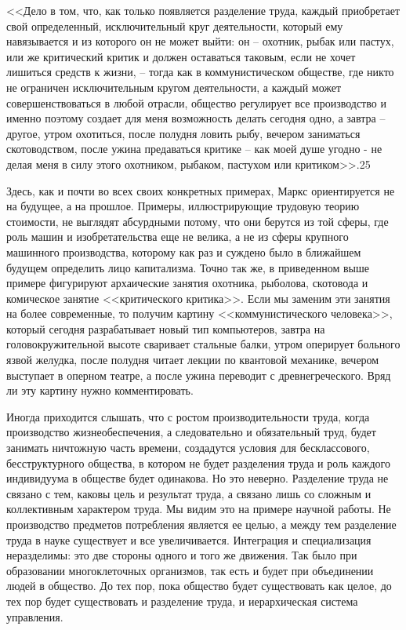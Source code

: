 \documentclass{book}
\begin{document}
<<Дело в том, что, как только появляется разделение труда, каждый приобретает свой определенный, исключительный круг деятельности, который ему навязывается и из которого он не может выйти: он -- охотник, рыбак или пастух, или же критический критик и должен оставаться таковым, если не хочет лишиться средств к жизни, -- тогда как в коммунисти­ческом обществе, где никто не ограничен исключительным кругом деятельности, а каждый может совершенствоваться в любой отрасли, общество регулирует все производство и именно поэтому создает для меня возможность делать сегод­ня одно, а завтра -- другое, утром охотиться, после полудня ловить рыбу, вечером заниматься скотоводством, после ужина предаваться критике -- как моей душе угодно - не делая ме­ня в силу этого охотником, рыбаком, пастухом или крити­ком>>.25

Здесь, как и почти во всех своих конкретных примерах, Маркс ориентируется не на будущее, а на прошлое. Примеры, иллюстрирующие трудовую теорию стоимости, не выглядят абсурдными потому, что они берутся из той сферы, где роль машин и изобретательства еще не велика, а не из сферы круп­ного машинного производства, которому как раз и суждено было в ближайшем будущем определить лицо капитализма. Точно так же, в приведенном выше примере фигурируют арха­ические занятия охотника, рыболова, скотовода и комиче­ское занятие <<критического критика>>. Если мы заменим эти занятия на более современные, то получим картину <<коммуни­стического человека>>, который сегодня разрабатывает новый тип компьютеров, завтра на головокружительной высоте сва­ривает стальные балки, утром оперирует больного язвой же­лудка, после полудня читает лекции по квантовой механике, вечером выступает в оперном театре, а после ужина переводит с древнегреческого. Вряд ли эту картину нужно комментиро­вать.

Иногда приходится слышать, что с ростом производитель­ности труда, когда производство жизнеобеспечения, а следо­вательно и обязательный труд, будет занимать ничтожную часть времени, создадутся условия для бесклассового, бесструктур­ного общества, в котором не будет разделения труда и роль каждого индивидуума в обществе будет одинакова. Но это не­верно. Разделение труда не связано с тем, каковы цель и ре­зультат труда, а связано лишь со сложным и коллективным характером труда. Мы видим это на примере научной работы. Не производство предметов потребления является ее целью, а между тем разделение труда в науке существует и все увели­чивается. Интеграция и специализация неразделимы: это две стороны одного и того же движения. Так было при образова­нии многоклеточных организмов, так есть и будет при объе­динении людей в общество. До тех пор, пока общество будет существовать как целое, до тех пор будет существовать и раз­деление труда, и иерархическая система управления.
\end{document}
